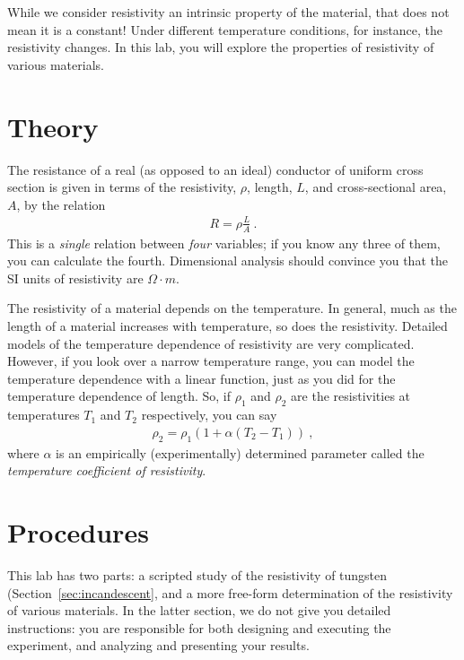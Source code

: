\documentclass[12pt]{article}
\begin{document}
While we consider resistivity an intrinsic property of the material,
that does not mean it is a constant!  Under different temperature
conditions, for instance, the resistivity changes.  In this lab, you
will explore the properties of resistivity of various materials.

\section{Theory}
\label{sec:theory}

The resistance of a real (as opposed to an ideal) conductor of uniform
cross section is given in terms of the resistivity, $\rho$, length,
$L$, and cross-sectional area, $A$, by the relation
\begin{gather}
  R = \rho \frac{L}{A}\ .
\label{eq:resistivity}
\end{gather}
This is a \textit{single} relation between \textit{four} variables; if
you know any three of them, you can calculate the fourth.  Dimensional
analysis should convince you that the SI units of resistivity are
$\unit{\Omega \cdot m}$.

The resistivity of a material depends on the temperature.  In general,
much as the length of a material increases with temperature, so does
the resistivity.  Detailed models of the temperature dependence of
resistivity are very complicated.  However, if you look over a narrow
temperature range, you can model the temperature dependence with a
linear function, just as you did for the temperature dependence of
length. So, if $\rho_1$ and $\rho_2$ are the resistivities at
temperatures $T_1$ and $T_2$ respectively, you can say
\begin{gather*}
  \rho_2 = \rho_1 \left(1 + \alpha (T_2 - T_1) \right)\ ,
\end{gather*}
where $\alpha$ is an empirically (experimentally) determined
parameter called the \textit{temperature coefficient of resistivity}.

\section{Procedures}
\label{sec:procedures}

This lab has two parts: a scripted study of the resistivity of
tungsten (Section~\ref{sec:incandescent}, and a more free-form
determination of the resistivity of various materials.  In the latter
section, we do not give you detailed instructions: you are responsible
for both designing and executing the experiment, and analyzing and
presenting your results.
\end{document}

